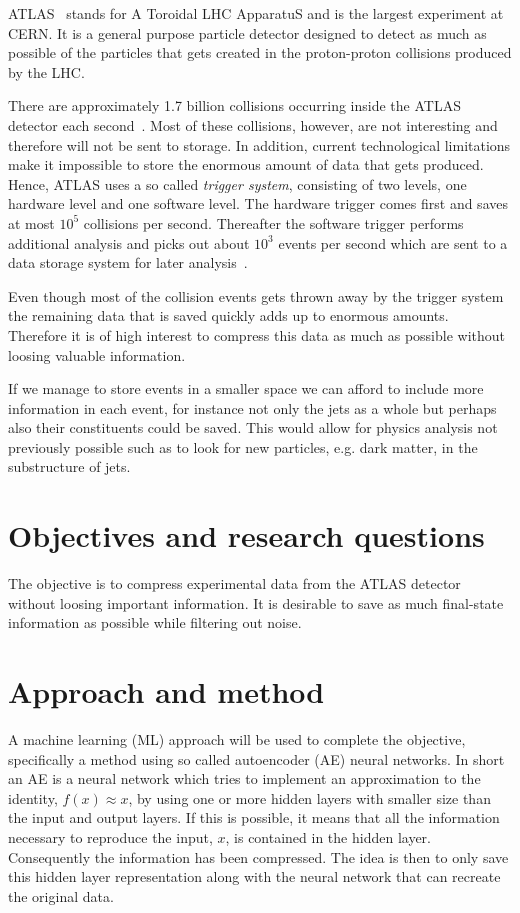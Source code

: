 \documentclass[11pt]{article}
\begin{document}
ATLAS~\cite{Collaboration_2008} stands for A Toroidal LHC ApparatuS and is the largest experiment at CERN. It is a general purpose particle detector designed to detect as much as possible of the particles that gets created in the proton-proton collisions produced by the LHC.

There are approximately 1.7 billion collisions occurring inside the ATLAS detector each second~\cite{trigger_das}. Most of these collisions, however, are not interesting and therefore will not be sent to storage. In addition, current technological limitations make it impossible to store the enormous amount of data that gets produced. Hence, ATLAS uses a so called \emph{trigger system}, consisting of two levels, one hardware level and one software level. The hardware trigger comes first and saves at most $10^5$ collisions per second. Thereafter the software trigger performs additional analysis and picks out about $10^3$ events per second which are sent to a data storage system for later analysis~\cite{trigger_das}.

Even though most of the collision events gets thrown away by the trigger system the remaining data that is saved quickly adds up to enormous amounts. Therefore it is of high interest to compress this data as much as possible without loosing valuable information.

If we manage to store events in a smaller space we can afford to include more information in each event, for instance not only the jets as a whole but perhaps also their constituents could be saved. This would allow for physics analysis not previously possible such as to look for new particles, e.g. dark matter, in the substructure of jets.

\section{Objectives and research questions}

The objective is to compress experimental data from the ATLAS detector without loosing important information. It is desirable to save as much final-state information as possible while filtering out noise.

\section{Approach and method}

A machine learning (ML) approach will be used to complete the objective, specifically a method using so called autoencoder (AE) neural networks. In short an AE is a neural network which tries to implement an approximation to the identity, $f(x) \approx x$, by using one or more hidden layers with smaller size than the input and output layers. If this is possible, it means that all the information necessary to reproduce the input, $x$, is contained in the hidden layer. Consequently the information has been compressed. The idea is then to only save this hidden layer representation along with the neural network that can recreate the original data.
\end{document}
